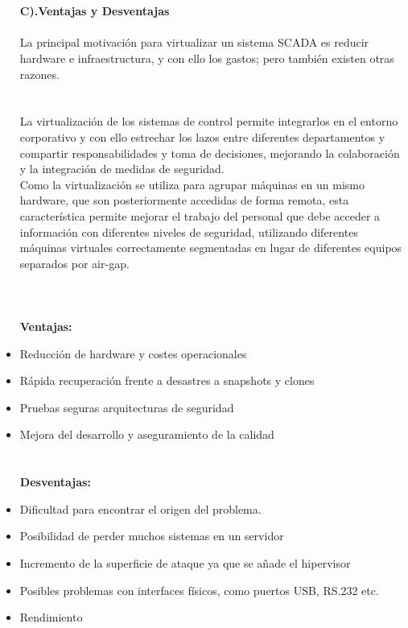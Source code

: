 \documentclass[twoside,twocolumn]{article}
\begin{document}
\begin{flushright}
\begin{itemize}
\textbf{}\\
\textbf{}\\
 \textbf{C).Ventajas y Desventajas}\\
\textbf{}\\
La principal motivación para virtualizar un sistema SCADA es reducir hardware e infraestructura, y con ello los gastos; pero también existen otras razones.\textbf{}\\
\textbf{}\\
\textbf{}\\
La virtualización de los sistemas de control permite integrarlos en el entorno corporativo y con ello estrechar los lazos entre diferentes departamentos y compartir responsabilidades y toma de decisiones, mejorando la colaboración y la integración de medidas de seguridad.
\textbf{}\\
Como la virtualización se utiliza para agrupar máquinas en un mismo hardware, que son posteriormente accedidas de forma remota, esta característica permite mejorar el trabajo del personal que debe acceder a información con diferentes niveles de seguridad, utilizando diferentes máquinas virtuales correctamente segmentadas en lugar de diferentes equipos separados por air-gap.
\textbf{}\\
\textbf{}\\
\textbf{}\\
\textbf{}\\
\textbf{Ventajas: }\\
\item	Reducción de hardware y costes operacionales
\item	Rápida recuperación frente a desastres a snapshots y clones
\item	Pruebas seguras arquitecturas de seguridad
\item	Mejora del desarrollo y aseguramiento de la calidad
\textbf{}\\
\textbf{}\\
\textbf{}\\
\textbf{Desventajas:}\\

\item	Dificultad para encontrar el origen del problema.
\item	Posibilidad de perder muchos sistemas en un servidor
\item	Incremento de la superficie de ataque ya que se añade el hipervisor
\item	Posibles problemas con interfaces físicos, como puertos USB, RS.232 etc.
\item	Rendimiento




\end{itemize}
\end{flushright}
\end{document}
